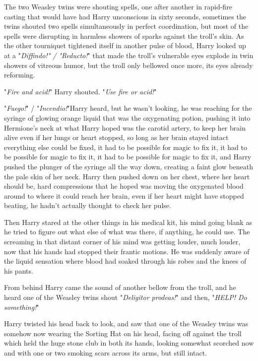 The two Weasley twins were shouting spells, one after another in rapid-fire 
casting that would have had Harry unconscious in sixty seconds, sometimes the 
twins shouted two spells simultaneously in perfect coordination, but most of 
the spells were disrupting in harmless showers of sparks against the troll's 
skin. As the other tourniquet tightened itself in another pulse of blood, Harry 
looked up at a "\emph{Diffindo!" / "Reducto!}" that made the troll's vulnerable 
eyes explode in twin showers of vitreous humor, but the troll only bellowed 
once more, its eyes already reforming.

"\emph{Fire and acid!}" Harry shouted. "\emph{Use fire or acid!}"

"\emph{Fuego!}" / "\emph{Incendio!}"Harry heard, but he wasn't looking, he was 
reaching for the syringe of glowing orange liquid that was the oxygenating 
potion, pushing it into Hermione's neck at what Harry hoped was the carotid 
artery, to keep her brain alive even if her lungs or heart stopped, so long as 
her brain stayed intact everything else could be fixed, it had to be possible 
for magic to fix it, it had to be possible for magic to fix it, it had to be 
possible for magic to fix it, and Harry pushed the plunger of the syringe all 
the way down, creating a faint glow beneath the pale skin of her neck. Harry 
then pushed down on her chest, where her heart should be, hard compressions 
that he hoped was moving the oxygenated blood around to where it could reach 
her brain, even if her heart might have stopped beating, he hadn't actually 
thought to check her pulse.

Then Harry stared at the other things in his medical kit, his mind going blank 
as he tried to figure out what else of what was there, if anything, he could 
use. The screaming in that distant corner of his mind was getting louder, much 
louder, now that his hands had stopped their frantic motions. He was suddenly 
aware of the liquid sensation where blood had soaked through his robes and the 
knees of his pants.

From behind Harry came the sound of another bellow from the troll, and he heard 
one of the Weasley twins shout "\emph{Deligitor prodeas!}" and then, 
"\emph{HELP! Do something!}"

Harry twisted his head back to look, and saw that one of the Weasley twins was 
somehow now wearing the Sorting Hat on his head, facing off against the troll 
which held the huge stone club in both its hands, looking somewhat scorched now 
and with one or two smoking scars across its arms, but still intact.


